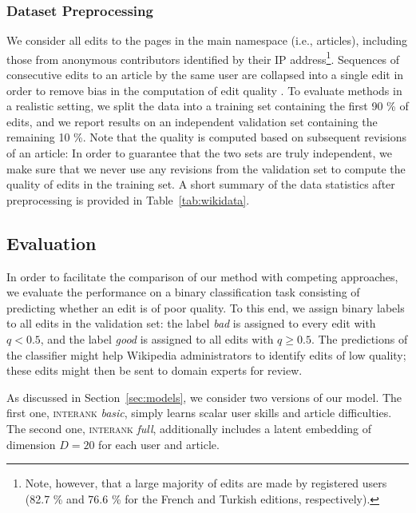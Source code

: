 \subsubsection{Dataset Preprocessing}

We consider all edits to the pages in the main namespace (i.e., articles), including those from anonymous contributors identified by their IP address\footnote{%
	Note, however, that a large majority of edits are made by registered users (\num{82.7} \% and \num{76.6} \% for the French and Turkish editions, respectively).}.
Sequences of consecutive edits to an article by the same user are collapsed into a single edit in order to remove bias in the computation of edit quality \citep{adler2007content}.
To evaluate methods in a realistic setting, we split the data into a training set containing the first \num{90} \% of edits, and we report results on an independent validation set containing the remaining \num{10} \%.
Note that the quality is computed based on subsequent revisions of an article:
In order to guarantee that the two sets are truly independent, we make sure that we never use any revisions from the validation set to compute the quality of edits in the training set.
A short summary of the data statistics after preprocessing is provided in Table~\ref{tab:wikidata}.


\subsection{Evaluation}

In order to facilitate the comparison of our method with competing approaches, we evaluate the performance on a binary classification task consisting of predicting whether an edit is of poor quality.
To this end, we assign binary labels to all edits in the validation set: the label \emph{bad} is assigned to every edit with $q < 0.5$, and the label \emph{good} is assigned to all edits with $q \ge 0.5$.
The predictions of the classifier might help Wikipedia administrators to identify edits of low quality;
these edits might then be sent to domain experts for review.

As discussed in Section~\ref{sec:models}, we consider two versions of our model.
The first one, \textsc{interank} \emph{basic}, simply learns scalar user skills and article difficulties.
The second one, \textsc{interank} \emph{full}, additionally includes a latent embedding of dimension $D = 20$ for each user and article.

